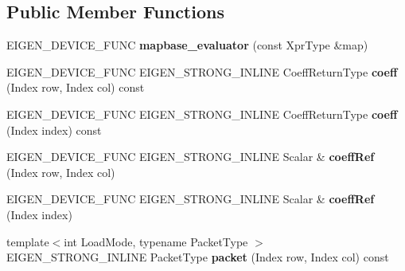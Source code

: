 \subsection*{Public Member Functions}
\begin{DoxyCompactItemize}
\item 
\mbox{\label{struct_eigen_1_1internal_1_1mapbase__evaluator_adeebd40502dff8fa523e7c17aa06abb2}} 
E\+I\+G\+E\+N\+\_\+\+D\+E\+V\+I\+C\+E\+\_\+\+F\+U\+NC {\bfseries mapbase\+\_\+evaluator} (const Xpr\+Type \&map)
\item 
\mbox{\label{struct_eigen_1_1internal_1_1mapbase__evaluator_a4dbe712d8bdb561e02b1420abdcc6cdc}} 
E\+I\+G\+E\+N\+\_\+\+D\+E\+V\+I\+C\+E\+\_\+\+F\+U\+NC E\+I\+G\+E\+N\+\_\+\+S\+T\+R\+O\+N\+G\+\_\+\+I\+N\+L\+I\+NE Coeff\+Return\+Type {\bfseries coeff} (Index row, Index col) const
\item 
\mbox{\label{struct_eigen_1_1internal_1_1mapbase__evaluator_a36d8eb7d3a2e378aa1bfde1d353f5382}} 
E\+I\+G\+E\+N\+\_\+\+D\+E\+V\+I\+C\+E\+\_\+\+F\+U\+NC E\+I\+G\+E\+N\+\_\+\+S\+T\+R\+O\+N\+G\+\_\+\+I\+N\+L\+I\+NE Coeff\+Return\+Type {\bfseries coeff} (Index index) const
\item 
\mbox{\label{struct_eigen_1_1internal_1_1mapbase__evaluator_ac9694e32bc42a9bf79e048ead295107b}} 
E\+I\+G\+E\+N\+\_\+\+D\+E\+V\+I\+C\+E\+\_\+\+F\+U\+NC E\+I\+G\+E\+N\+\_\+\+S\+T\+R\+O\+N\+G\+\_\+\+I\+N\+L\+I\+NE Scalar \& {\bfseries coeff\+Ref} (Index row, Index col)
\item 
\mbox{\label{struct_eigen_1_1internal_1_1mapbase__evaluator_a62d6d58da26d33a14ed1a755acecd97d}} 
E\+I\+G\+E\+N\+\_\+\+D\+E\+V\+I\+C\+E\+\_\+\+F\+U\+NC E\+I\+G\+E\+N\+\_\+\+S\+T\+R\+O\+N\+G\+\_\+\+I\+N\+L\+I\+NE Scalar \& {\bfseries coeff\+Ref} (Index index)
\item 
\mbox{\label{struct_eigen_1_1internal_1_1mapbase__evaluator_afb33856cd493fbdffb2f57915dcd8888}} 
{\footnotesize template$<$int Load\+Mode, typename Packet\+Type $>$ }\\E\+I\+G\+E\+N\+\_\+\+S\+T\+R\+O\+N\+G\+\_\+\+I\+N\+L\+I\+NE Packet\+Type {\bfseries packet} (Index row, Index col) const

\end{DoxyCompactItemize}

